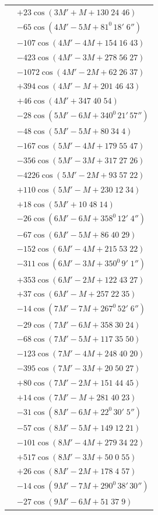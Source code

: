 \begin{landscape}
\begin{longtable}{@{}r@{}l@{}}
&\(+23\cos(3M'+M+130\;24\;46)\)\\[3pt]
&\(-65\cos(4M'-5M+81^0\,18'\;6'')\)\\
&\(-107\cos(4M'-4M+154\;16\;43)\)\\
&\(-423\cos(4M'-3M+278\;56\;27)\)\\
&\(-1072\cos(4M'-2M+62\;26\;37)\)\\
&\(+394\cos(4M'-M+201\;46\;43)\)\\
&\(+46\cos(4M'+347\;40\;54)\)\\[3pt]
&\(-28\cos(5M'-6M+340^0\,21'\,57'')\)\\
&\(-48\cos(5M'-5M+80\;34\;4)\)\\
&\(-167\cos(5M'-4M+179\;55\;47)\)\\
&\(-356\cos(5M'-3M+317\;27\;26)\)\\
&\(-4226\cos(5M'-2M+93\;57\;22)\)\\
&\(+110\cos(5M'-M+230\;12\;34)\)\\
&\(+18\cos(5M'+10\;48\;14)\)\\[3pt]
&\(-26\cos(6M'-6M+358^0\,12'\;4'')\)\\
&\(-67\cos(6M'-5M+86\;40\;29)\)\\
&\(-152\cos(6M'-4M+215\;53\;22)\)\\
&\(-311\cos(6M'-3M+350^0\,9'\;1'')\)\\
&\(+353\cos(6M'-2M+122\;43\;27)\)\\
&\(+37\cos(6M'-M+257\;22\;35)\)\\[3pt]
&\(-14\cos(7M'-7M+267^0\,52'\;6'')\)\\
&\(-29\cos(7M'-6M+358\;30\;24)\)\\
&\(-68\cos(7M'-5M+117\;35\;50)\)\\
&\(-123\cos(7M'-4M+248\;40\;20)\)\\
&\(-395\cos(7M'-3M+20\;50\;27)\)\\
&\(+80\cos(7M'-2M+151\;44\;45)\)\\
&\(+14\cos(7M'-M+281\;40\;23)\)\\[3pt]
&\(-31\cos(8M'-6M+22^0\,30'\;5'')\)\\
&\(-57\cos(8M'-5M+149\;12\;21)\)\\
&\(-101\cos(8M'-4M+279\;34\;22)\)\\
&\(+517\cos(8M'-3M+50\;0\;55)\)\\
&\(+26\cos(8M'-2M+178\;4\;57)\)\\[3pt]
&\(-14\cos(9M'-7M+290^0\,38'\,30'')\)\\
&\(-27\cos(9M'-6M+51\;37\;9)\)\\

\end{longtable}
\end{landscape}
